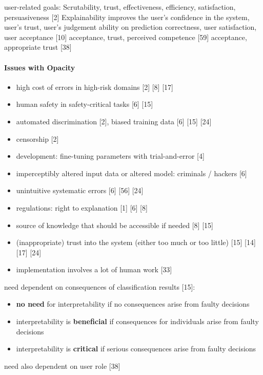 user-related goals: \newline
Scrutability, trust, effectiveness, efficiency, satisfaction, persuasiveness [2] \newline
Explainability improves the user's confidence in the system, user's trust, user's judgement ability on prediction correctness, user satisfaction, user acceptance [10] \newline
acceptance, trust, perceived competence [59] \newline
acceptance, appropriate trust [38] \newline

\paragraph{Issues with Opacity}
\begin{itemize}
	\item high cost of errors in high-risk domains [2] [8] [17]
	\item human safety in safety-critical tasks [6] [15]
	\item automated discrimination [2], biased training data [6] [15] [24]
	\item censorship [2]
	\item development: fine-tuning parameters with trial-and-error [4]
	\item imperceptibly altered input data or altered model: criminals / hackers [6]
	\item unintuitive systematic errors [6] [56] [24]
	\item regulations: right to explanation [1] [6] [8]
	\item source of knowledge that should be accessible if needed [8] [15]
	\item (inappropriate) trust into the system (either too much or too little) [15] [14] [17] [24]
	\item implementation involves a lot of human work [33]
\end{itemize}
need dependent on consequences of classification results [15]:
\begin{itemize}
	\item \textbf{no need} for interpretability if no consequences arise from faulty decisions
	\item interpretability is \textbf{beneficial} if consequences for individuals arise from faulty decisions
	\item interpretability is \textbf{critical} if serious consequences arise from faulty decisions
\end{itemize}
need also dependent on user role [38] \newline

